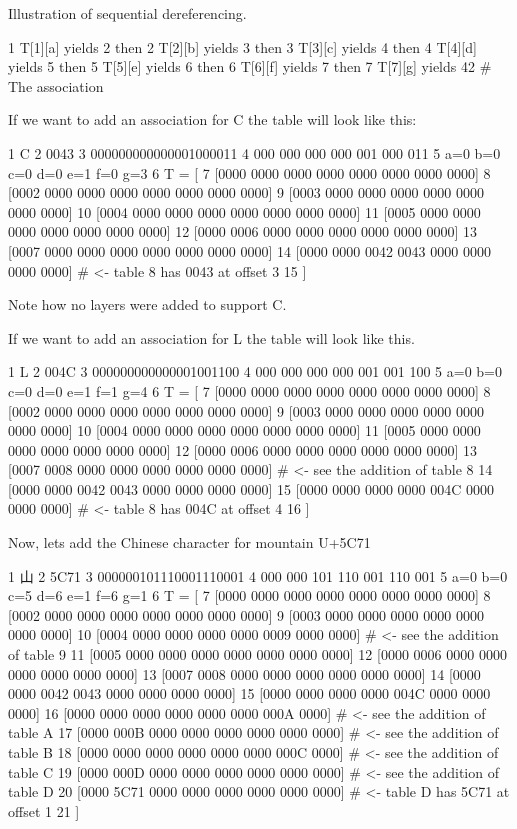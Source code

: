 Illustration of sequential dereferencing. 
\begin{DoxyCode}
1 T[1][a] yields 2 then
2 T[2][b] yields 3 then
3 T[3][c] yields 4 then
4 T[4][d] yields 5 then
5 T[5][e] yields 6 then
6 T[6][f] yields 7 then
7 T[7][g] yields 42  # The association
\end{DoxyCode}


If we want to add an association for \textquotesingle{}C\textquotesingle{} the table will look like this\+: 
\begin{DoxyCode}
1 C
2 0043
3 000000000000001000011
4 000 000 000 000 001 000 011
5 a=0 b=0 c=0 d=0 e=1 f=0 g=3
6 T = [
7  [0000 0000 0000 0000 0000 0000 0000 0000]
8  [0002 0000 0000 0000 0000 0000 0000 0000]
9  [0003 0000 0000 0000 0000 0000 0000 0000]
10  [0004 0000 0000 0000 0000 0000 0000 0000]
11  [0005 0000 0000 0000 0000 0000 0000 0000]
12  [0000 0006 0000 0000 0000 0000 0000 0000]
13  [0007 0000 0000 0000 0000 0000 0000 0000]
14  [0000 0000 0042 0043 0000 0000 0000 0000] # <- table 8 has 0043 at offset 3
15 ]
\end{DoxyCode}
 Note how no layers were added to support \textquotesingle{}C\textquotesingle{}.

If we want to add an association for \textquotesingle{}L\textquotesingle{} the table will look like this. 
\begin{DoxyCode}
1 L
2 004C
3 000000000000001001100
4 000 000 000 000 001 001 100
5 a=0 b=0 c=0 d=0 e=1 f=1 g=4
6 T = [
7  [0000 0000 0000 0000 0000 0000 0000 0000]
8  [0002 0000 0000 0000 0000 0000 0000 0000]
9  [0003 0000 0000 0000 0000 0000 0000 0000]
10  [0004 0000 0000 0000 0000 0000 0000 0000]
11  [0005 0000 0000 0000 0000 0000 0000 0000]
12  [0000 0006 0000 0000 0000 0000 0000 0000]
13  [0007 0008 0000 0000 0000 0000 0000 0000] # <- see the addition of table 8
14  [0000 0000 0042 0043 0000 0000 0000 0000]
15  [0000 0000 0000 0000 004C 0000 0000 0000] # <- table 8 has 004C at offset 4
16 ]
\end{DoxyCode}


Now, let\textquotesingle{}s add the Chinese character for mountain U+5\+C71 
\begin{DoxyCode}
1 山
2 5C71
3 000000101110001110001 
4 000 000 101 110 001 110 001
5 a=0 b=0 c=5 d=6 e=1 f=6 g=1
6 T = [
7  [0000 0000 0000 0000 0000 0000 0000 0000]
8  [0002 0000 0000 0000 0000 0000 0000 0000]
9  [0003 0000 0000 0000 0000 0000 0000 0000]
10  [0004 0000 0000 0000 0000 0009 0000 0000] # <- see the addition of table 9
11  [0005 0000 0000 0000 0000 0000 0000 0000]
12  [0000 0006 0000 0000 0000 0000 0000 0000]
13  [0007 0008 0000 0000 0000 0000 0000 0000]
14  [0000 0000 0042 0043 0000 0000 0000 0000]
15  [0000 0000 0000 0000 004C 0000 0000 0000]
16  [0000 0000 0000 0000 0000 0000 000A 0000] # <- see the addition of table A
17  [0000 000B 0000 0000 0000 0000 0000 0000] # <- see the addition of table B
18  [0000 0000 0000 0000 0000 0000 000C 0000] # <- see the addition of table C
19  [0000 000D 0000 0000 0000 0000 0000 0000] # <- see the addition of table D
20  [0000 5C71 0000 0000 0000 0000 0000 0000] # <- table D has 5C71 at offset 1
21 ]
\end{DoxyCode}



